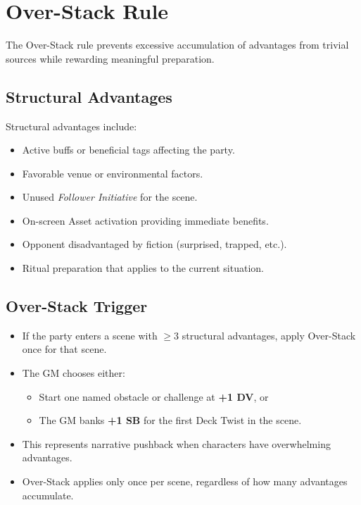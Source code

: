 \section{Over-Stack Rule}
\label{sec:over-stack}

The Over-Stack rule prevents excessive accumulation of advantages from trivial sources while rewarding meaningful preparation.

\subsection{Structural Advantages}
\label{subsec:structural-advantages}

Structural advantages include:
\begin{itemize}
\item Active buffs or beneficial tags affecting the party. 
\item Favorable venue or environmental factors. 
\item Unused \emph{Follower Initiative} for the scene. 
\item On-screen Asset activation providing immediate benefits. 
\item Opponent disadvantaged by fiction (surprised, trapped, etc.). 
\item Ritual preparation that applies to the current situation. 
\end{itemize}

\subsection{Over-Stack Trigger}
\label{subsec:overstack-trigger}

\begin{itemize}
\item If the party enters a scene with $\geq 3$ structural advantages, apply Over-Stack once for that scene.
\item The GM chooses either:
  \begin{itemize}
  \item Start one named obstacle or challenge at \textbf{+1 DV}, or 
  \item The GM banks \textbf{+1 SB} for the first Deck Twist in the scene. 
  \end{itemize}
\item This represents narrative pushback when characters have overwhelming advantages.
\item Over-Stack applies only once per scene, regardless of how many advantages accumulate.
\end{itemize}
